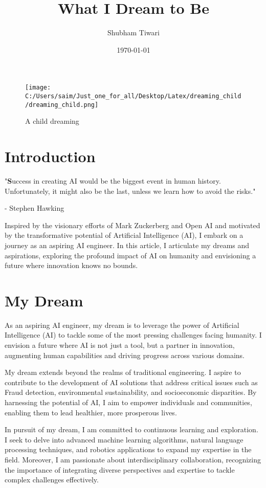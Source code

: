 \documentclass[12pt]{a4paper}{article}
\title{\Large\textbf{What I Dream to Be}}
\author{Shubham Tiwari}
\date{\today}
\begin{document}
\begin{wrapfigure}{r}{0.2\textwidth}
    \vspace{-2.5\baselineskip}
    \texttt{[image: C:/Users/saim/Just\_one\_for\_all/Desktop/Latex/dreaming\_child/dreaming\_child.png]} 
    \caption{A child dreaming}
    \label{fig:dreaming_child}
\end{wrapfigure}


\maketitle


\section{Introduction}
"\textbf{S}uccess in creating AI would be the biggest event in human history. Unfortunately, it might also be the last, unless we learn how to avoid the risks."
\begin{flushright}
- Stephen Hawking
\end{flushright}

Inspired by the visionary efforts of Mark Zuckerberg and Open AI and motivated by the transformative potential of Artificial Intelligence (AI), I embark on a journey as an aspiring AI engineer. In this article, I articulate my dreams and aspirations, exploring the profound impact of AI on humanity and envisioning a future where innovation knows no bounds.

\section{My Dream}

As an aspiring AI engineer, my dream is to leverage the power of Artificial Intelligence (AI) to tackle some of the most pressing challenges facing humanity. I envision a future where AI is not just a tool, but a partner in innovation, augmenting human capabilities and driving progress across various domains.

My dream extends beyond the realms of traditional engineering. I aspire to contribute to the development of AI solutions that address critical issues such as Fraud detection, environmental sustainability, and socioeconomic disparities. By harnessing the potential of AI, I aim to empower individuals and communities, enabling them to lead healthier, more prosperous lives.

In pursuit of my dream, I am committed to continuous learning and exploration. I seek to delve into advanced machine learning algorithms, natural language processing techniques, and robotics applications to expand my expertise in the field. Moreover, I am passionate about interdisciplinary collaboration, recognizing the importance of integrating diverse perspectives and expertise to tackle complex challenges effectively.
\end{document}
